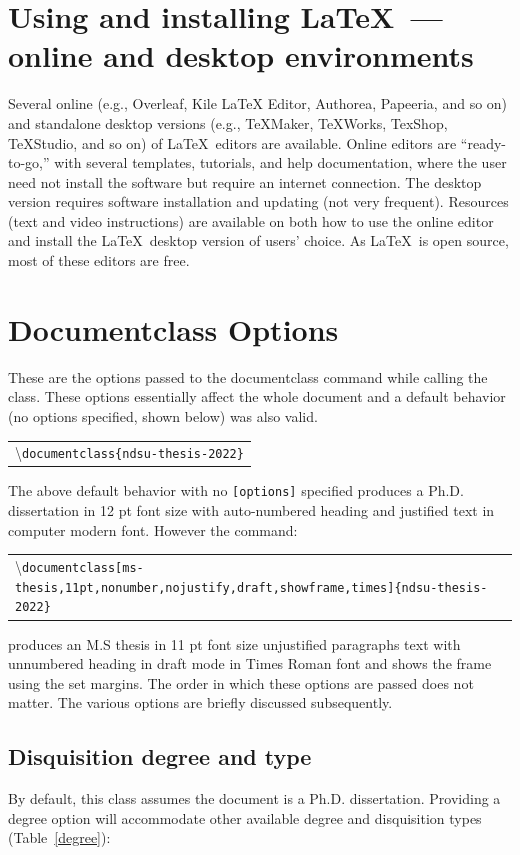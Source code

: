 \documentclass{article}
\newcommand\cmd[1]{\textbackslash\texttt{#1}}
\newcommand\ix[1]{#1\index{#1}} %
\newcommand\ccmd[1]{ %
\begin{center}
\begin{tabular}{l}
#1
\end{tabular}
\end{center}
}
\begin{document}
\section{Using and installing \LaTeX\  --- online and desktop environments}  
Several online (e.g., Overleaf, Kile LaTeX Editor, Authorea, Papeeria, and so on) and standalone desktop versions (e.g., TeXMaker, TeXWorks, TexShop, TeXStudio, and so on) of \LaTeX\ editors are available. Online editors are ``ready-to-go,'' with several templates, tutorials, and help documentation, where the user need not install the software but require an internet connection. The desktop version requires software installation and updating (not very frequent). Resources (text and video instructions) are available on both how to use the online editor and install the \LaTeX\ desktop version of users' choice. As \LaTeX\ is open source, most of these editors are free.

\section{Documentclass Options}
These are the \ix{options} passed to the \ix{documentclass} command while calling the class. These options essentially affect the whole document and a \ix{default behavior} (no options specified, shown below) was also valid.
\ccmd{\cmd{documentclass\{ndsu-thesis-2022\}}}
The above default behavior with no \texttt{[options]} specified produces a Ph.D. dissertation in 12 pt font size with auto-numbered heading and justified text in computer modern font. However the command:\vspace{-2ex}\ccmd{\cmd{documentclass[ms-thesis,11pt,nonumber,nojustify,draft,showframe,times]\{ndsu-thesis-2022\}}} produces an M.S thesis in 11 pt font size unjustified paragraphs text with unnumbered heading in draft mode in Times Roman font and shows the frame using the set margins. The order in which these options are passed does not matter. The various options are briefly discussed subsequently.

\subsection{Disquisition degree and type}
\label{degtype}
By default, this class assumes the document is a Ph.D. dissertation. Providing a degree option will accommodate other available degree and disquisition types (Table~\ref{degree}):
\end{document}
